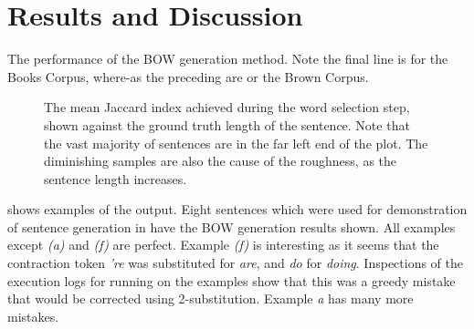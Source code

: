 \documentclass{llncs}
\begin{document}
\section{Results and Discussion} \label{results}



\begin{table}
	\caption{\label{table:overall} The performance of the BOW generation method. Note the final line is for the Books Corpus, where-as the preceding are or the Brown Corpus.}
\end{table}


\begin{figure}




	\caption{\label{figure:exactlenscore} The mean Jaccard index achieved during the word selection step, shown against the ground truth length of the sentence. Note that the vast majority of sentences are in the far left end of the plot. The diminishing samples are also the cause of the roughness, as the sentence length increases.}
\end{figure}




  shows examples of the output. Eight sentences which were used for demonstration of sentence generation in \textcite{iyyer2014generating,Bowman2015SmoothGeneration} have the BOW generation results shown. All examples except \emph{(a)} and \emph{(f)} are perfect. Example \emph{(f)} is interesting as it seems that the contraction token \emph{'re} was substituted for \emph{are}, and \emph{do} for \emph{doing}. Inspections of the execution logs for running on the examples show that this was a greedy mistake that would be corrected using 2-substitution.  Example \emph{a} has many more mistakes.
\end{document}
